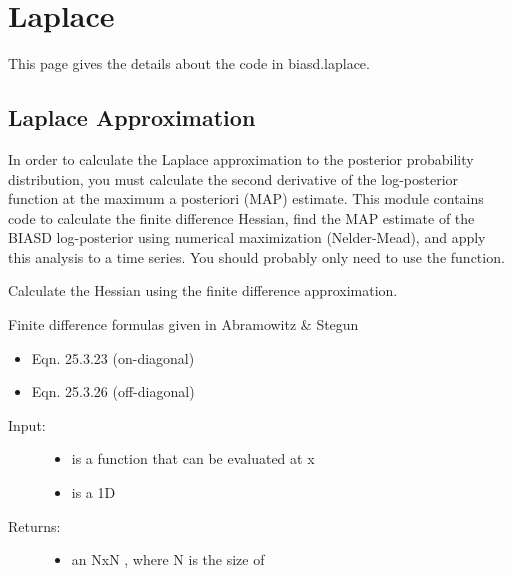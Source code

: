 \documentclass[letterpaper,10pt,english]{sphinxmanual}
\begin{document}
\section{Laplace}
\label{code_laplace::doc}\label{code_laplace:laplace}\label{code_laplace:code-laplace}
This page gives the details about the code in biasd.laplace.


\subsection{Laplace Approximation}
\label{code_laplace:laplace-approximation}
In order to calculate the Laplace approximation to the posterior probability distribution, you must calculate the second derivative of the log-posterior function at the maximum a posteriori (MAP) estimate. This module contains code to calculate the finite difference Hessian, find the MAP estimate of the BIASD log-posterior using numerical maximization (Nelder-Mead), and apply this analysis to a time series. You should probably only need to use the  function.
\label{code_laplace:module-laplace}

\begin{fulllineitems}
\label{code_laplace:laplace.calc_hessian}
Calculate the Hessian using the finite difference approximation.

Finite difference formulas given in Abramowitz \& Stegun
\begin{itemize}
\item {} 
Eqn. 25.3.23 (on-diagonal)

\item {} 
Eqn. 25.3.26 (off-diagonal)

\end{itemize}
\begin{description}
\item[{Input:}] \leavevmode\begin{itemize}
\item {} 
 is a function that can be evaluated at x

\item {} 
 is a 1D 

\end{itemize}

\item[{Returns:}] \leavevmode\begin{itemize}
\item {} 
an NxN , where N is the size of 

\end{itemize}

\end{description}

\end{fulllineitems}
\end{document}
